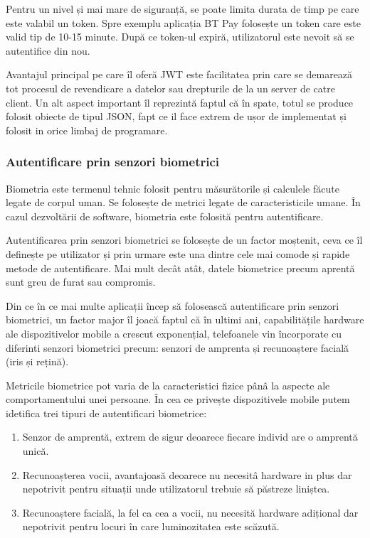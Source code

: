 \documentclass[12pt]{article}
\begin{document}
Pentru un nivel și mai mare de siguranță, se poate limita durata de timp
pe care este valabil un token. Spre exemplu aplicația BT Pay folosește un token
care este valid tip de 10-15 minute. După ce token-ul expiră, utilizatorul este nevoit
să se autentifice din nou.

Avantajul principal pe care îl oferă JWT este facilitatea prin care se demarează tot procesul
de revendicare a datelor sau drepturile de la un server de catre client.  
Un alt aspect important îl reprezintă faptul că în spate, totul se produce folosit obiecte
de tipul JSON, fapt ce il face extrem de ușor de implementat și folosit in orice limbaj
de programare.

\subsubsection{Autentificare prin senzori biometrici}

Biometria este termenul tehnic folosit pentru măsurătorile și calculele făcute legate
de corpul uman. Se folosește de metrici legate de caracteristicile umane. În cazul
dezvoltării de software, biometria este folosită pentru autentificare.

Autentificarea prin senzori biometrici se folosește de un factor moștenit, ceva ce îl definește pe
utilizator și prin urmare este una dintre cele mai comode și rapide metode de autentificare.
Mai mult decât atât, datele biometrice precum aprentă sunt greu de furat sau compromis.

Din ce în ce mai multe aplicații încep să folosească autentificare prin senzori 
biometrici, un factor major îl joacă faptul că în ultimi ani, capabilitățile hardware ale
dispozitivelor mobile a crescut exponențial, telefoanele vin încorporate cu diferinti
senzori biometrici precum: senzori de amprenta și recunoaștere facială (iris și rețină).

Metricile biometrice pot varia de la caracteristici fizice pânâ la aspecte ale 
comportamentului unei persoane. În cea ce privește dispozitivele mobile putem idetifica
trei tipuri de autentificari biometrice:

\begin{enumerate}
    \item Senzor de amprentă, extrem de sigur deoarece fiecare individ are
    o amprentă unică.
    \item Recunoașterea vocii, avantajoasă deoarece nu necesitâ hardware in plus dar
    nepotrivit pentru situații unde utilizatorul trebuie să păstreze liniștea.
    \item Recunoaștere facială, la fel ca cea a vocii, nu necesită hardware adițional dar 
    nepotrivit pentru locuri în care luminozitatea este scăzută. 
\end{enumerate}
\end{document}
